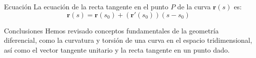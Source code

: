 \documentclass{beamer}
\begin{document}
	\begin{frame}{Ecuación}
		La ecuación de la recta tangente en el punto $P$ de la curva $\textbf{r}(s)$ es:
		\begin{equation*}
			\textbf{r}(s) = \textbf{r}(s_0) + (\textbf{r}'(s_0))(s - s_0)
		\end{equation*}
	\end{frame}
	
	\begin{frame}{Conclusiones}
		Hemos revisado conceptos fundamentales de la geometría diferencial, como la curvatura y torsión de una curva en el espacio tridimensional, así como el vector tangente unitario y la recta tangente en un punto dado.
	\end{frame}
	
\end{document}

